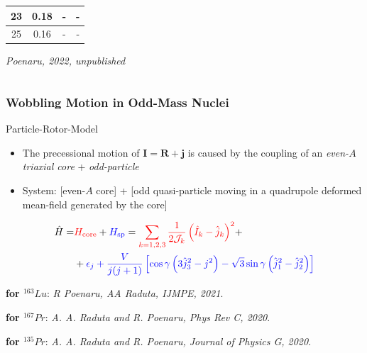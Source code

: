 \documentclass{beamer}
\begin{document}
\begin{frame}
\begin{columns}
\begin{column}{0.28\textwidth}
\begin{table}
{\begin{tabular}{|c|ccc|}
          23                   & \multicolumn{1}{c|}{0.18}       & \multicolumn{1}{c|}{-}           &  -            \\ \hline
          25                   & \multicolumn{1}{c|}{0.16}       & \multicolumn{1}{c|}{-}           &  -            \\ \hline
        \end{tabular}%
        }
      \end{table}
      \tiny{\emph{Poenaru, 2022, unpublished}}
      \end{column}
\end{columns}
\end{frame}

\begin{frame}
  \frametitle{Wobbling Motion in Odd-Mass Nuclei}
  \begin{block}{Particle-Rotor-Model}
    \begin{itemize}
      \item The precessional motion of $\mathbf{I}=\mathbf{R}+\mathbf{j}$ is caused by the coupling of an \emph{even-$A$ triaxial core} + \emph{odd-particle}
      \item System: {\color{red}[even-$A$ core]} + {\color{blue}[odd quasi-particle moving in a quadrupole deformed mean-field generated by the core]}
    \end{itemize}
  \end{block}
  {\small
  \begin{align}
    \hat{H}=&{\color{red}H_\text{core}}+{\color{blue}H_\text{sp}}={\color{red}\sum_{k=1,2,3}\frac{1}{2\mathcal{J}_k}\left(\hat{I}_k-\hat{j}_k\right)^2}+\nonumber\\
            &+{\color{blue}\epsilon_j+\frac{V}{j(j+1)}\left[\cos\gamma\left(3\hat{j}_3^2-j^2\right)-\sqrt{3}\sin\gamma\left(\hat{j}_1^2-\hat{j}_2^2\right)\right]}
  \end{align}}%
  \par{\tiny\textbf{for $^{163}Lu$}: \textit{R Poenaru, AA Raduta, IJMPE, 2021}.}
  \par{\tiny\textbf{for $^{167}Pr$}: \textit{A. A. Raduta and R. Poenaru, Phys Rev C, 2020}.}
  \par{\tiny\textbf{for $^{135}Pr$}: \textit{A. A. Raduta and R. Poenaru, Journal of Physics G, 2020}.}
\end{frame}
\end{document}
